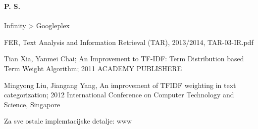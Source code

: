 \documentclass[a4paper,12pt]{article}
\begin{document}
\vspace{0.3cm}

\textbf{P. S.}\\
\\
Infinity > Googleplex

\medskip
 
\begin{thebibliography}{9}

FER, Text Analysis and Information Retrieval (TAR), 2013/2014, TAR-03-IR.pdf

Tian Xia, Yanmei Chai; An Improvement to TF-IDF: Term Distribution based Term Weight Algorithm; 2011 ACADEMY PUBLISHERE

Mingyong Liu, Jiangang Yang, An improvement of TFIDF weighting in text categorization; 2012 International Conference on Computer Technology and Science, Singapore

Za sve ostale implemtacijske detalje: www

\end{thebibliography}
\end{document}
